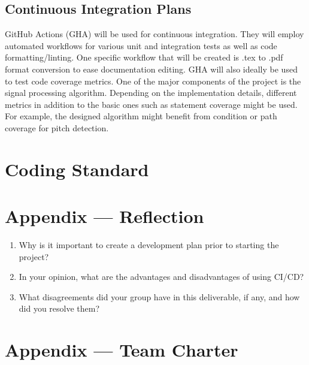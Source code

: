 \documentclass{article}
\begin{document}
\subsection{Continuous Integration Plans}
GitHub Actions (GHA) will be used for continuous integration. They will employ automated workflows for various unit and integration tests
as well as code formatting/linting. One specific workflow that will be created is .tex to .pdf format conversion to ease documentation editing.
GHA will also ideally be used to test code coverage metrics. One of the major components of the project is the signal processing algorithm.  
Depending on the implementation details, different metrics in addition to the basic ones such as statement coverage might be used. For example, the designed algorithm 
might benefit from condition or path coverage for pitch detection.

\section{Coding Standard}


\newpage{}

\section*{Appendix --- Reflection}




\begin{enumerate}
    \item Why is it important to create a development plan prior to starting the
    project?
    \item In your opinion, what are the advantages and disadvantages of using
    CI/CD?
    \item What disagreements did your group have in this deliverable, if any,
    and how did you resolve them?
\end{enumerate}

\newpage{}

\section*{Appendix --- Team Charter}

\end{document}

